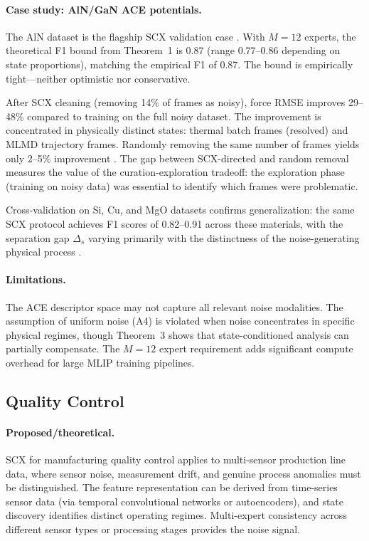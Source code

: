 \documentclass[twocolumn]{article}
\theoremstyle{definition}
\begin{document}
\paragraph{Case study: AlN/GaN ACE potentials.}
The AlN dataset is the flagship SCX validation case \cite{paperIII, paperIV}. With $M=12$ experts, the theoretical F1 bound from Theorem~1 is 0.87 (range 0.77--0.86 depending on state proportions), matching the empirical F1 of 0.87. The bound is empirically tight---neither optimistic nor conservative.

After SCX cleaning (removing 14\% of frames as noisy), force RMSE improves 29--48\% compared to training on the full noisy dataset. The improvement is concentrated in physically distinct states: thermal batch frames (resolved) and MLMD trajectory frames. Randomly removing the same number of frames yields only 2--5\% improvement \cite{paperII, paperIII}. The gap between SCX-directed and random removal measures the value of the curation-exploration tradeoff: the exploration phase (training on noisy data) was essential to identify which frames were problematic.

Cross-validation on Si, Cu, and MgO datasets confirms generalization: the same SCX protocol achieves F1 scores of 0.82--0.91 across these materials, with the separation gap $\Delta_s$ varying primarily with the distinctness of the noise-generating physical process \cite{paperIII}.

\paragraph{Limitations.}
The ACE descriptor space may not capture all relevant noise modalities. The assumption of uniform noise (A4) is violated when noise concentrates in specific physical regimes, though Theorem~3 shows that state-conditioned analysis can partially compensate. The $M=12$ expert requirement adds significant compute overhead for large MLIP training pipelines.

\subsection{Quality Control}

\paragraph{Proposed/theoretical.}
SCX for manufacturing quality control applies to multi-sensor production line data, where sensor noise, measurement drift, and genuine process anomalies must be distinguished. The feature representation can be derived from time-series sensor data (via temporal convolutional networks or autoencoders), and state discovery identifies distinct operating regimes. Multi-expert consistency across different sensor types or processing stages provides the noise signal.
\end{document}
